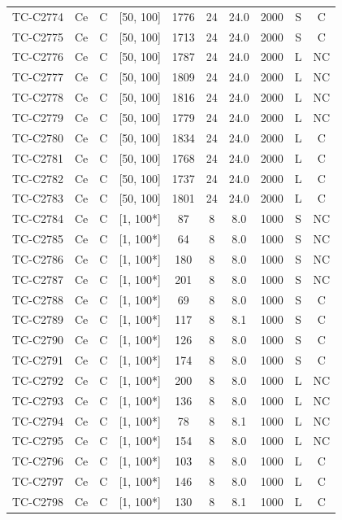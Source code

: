 \begin{longtable}{lccccccccc}
TC-C2774 & Ce & C & [50, 100] & 1776 & 24 & 24.0 & 2000 & S & C \\
TC-C2775 & Ce & C & [50, 100] & 1713 & 24 & 24.0 & 2000 & S & C \\
TC-C2776 & Ce & C & [50, 100] & 1787 & 24 & 24.0 & 2000 & L & NC \\
TC-C2777 & Ce & C & [50, 100] & 1809 & 24 & 24.0 & 2000 & L & NC \\
TC-C2778 & Ce & C & [50, 100] & 1816 & 24 & 24.0 & 2000 & L & NC \\
TC-C2779 & Ce & C & [50, 100] & 1779 & 24 & 24.0 & 2000 & L & NC \\
TC-C2780 & Ce & C & [50, 100] & 1834 & 24 & 24.0 & 2000 & L & C \\
TC-C2781 & Ce & C & [50, 100] & 1768 & 24 & 24.0 & 2000 & L & C \\
TC-C2782 & Ce & C & [50, 100] & 1737 & 24 & 24.0 & 2000 & L & C \\
TC-C2783 & Ce & C & [50, 100] & 1801 & 24 & 24.0 & 2000 & L & C \\
TC-C2784 & Ce & C & [1, 100*] & 87 & 8 & 8.0 & 1000 & S & NC \\
TC-C2785 & Ce & C & [1, 100*] & 64 & 8 & 8.0 & 1000 & S & NC \\
TC-C2786 & Ce & C & [1, 100*] & 180 & 8 & 8.0 & 1000 & S & NC \\
TC-C2787 & Ce & C & [1, 100*] & 201 & 8 & 8.0 & 1000 & S & NC \\
TC-C2788 & Ce & C & [1, 100*] & 69 & 8 & 8.0 & 1000 & S & C \\
TC-C2789 & Ce & C & [1, 100*] & 117 & 8 & 8.1 & 1000 & S & C \\
TC-C2790 & Ce & C & [1, 100*] & 126 & 8 & 8.0 & 1000 & S & C \\
TC-C2791 & Ce & C & [1, 100*] & 174 & 8 & 8.0 & 1000 & S & C \\
TC-C2792 & Ce & C & [1, 100*] & 200 & 8 & 8.0 & 1000 & L & NC \\
TC-C2793 & Ce & C & [1, 100*] & 136 & 8 & 8.0 & 1000 & L & NC \\
TC-C2794 & Ce & C & [1, 100*] & 78 & 8 & 8.1 & 1000 & L & NC \\
TC-C2795 & Ce & C & [1, 100*] & 154 & 8 & 8.0 & 1000 & L & NC \\
TC-C2796 & Ce & C & [1, 100*] & 103 & 8 & 8.0 & 1000 & L & C \\
TC-C2797 & Ce & C & [1, 100*] & 146 & 8 & 8.0 & 1000 & L & C \\
TC-C2798 & Ce & C & [1, 100*] & 130 & 8 & 8.1 & 1000 & L & C \\

\end{longtable}
